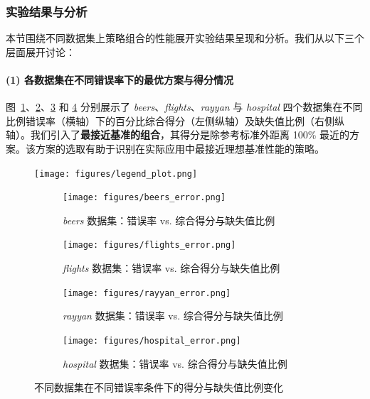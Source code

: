 \documentclass[10pt]{article} %
\numberwithin{equation}{section}
\begin{document}
\subsubsection{实验结果与分析}
\label{sec:exp_result_all}
本节围绕不同数据集上策略组合的性能展开实验结果呈现和分析。我们从以下三个层面展开讨论：
\paragraph{(1) 各数据集在不同错误率下的最优方案与得分情况}  
图~\ref{fig:beers_error}、\ref{fig:flights_error}、\ref{fig:rayyan_error} 和 \ref{fig:hospital_error} 分别展示了 \textit{beers}、\textit{flights}、\textit{rayyan} 与 \textit{hospital} 四个数据集在不同比例错误率（横轴）下的百分比综合得分（左侧纵轴）及缺失值比例（右侧纵轴）。我们引入了\textbf{最接近基准的组合}，其得分是除参考标准外距离 100\% 最近的方案。该方案的选取有助于识别在实际应用中最接近理想基准性能的策略。

\begin{figure}[htbp]
    \centering
    \texttt{[image: figures/legend\_plot.png]} %
    \vspace{-14pt} %
\end{figure}

\begin{figure}[htbp]
  \centering
  \begin{subfigure}{0.49\linewidth} %
    \centering
    \texttt{[image: figures/beers\_error.png]} %
    \caption{\textit{beers} 数据集：错误率 vs. 综合得分与缺失值比例}
    \label{fig:beers_error}
  \end{subfigure}
  \hfill
  \begin{subfigure}{0.49\linewidth}
    \centering
    \texttt{[image: figures/flights\_error.png]}
    \caption{\textit{flights} 数据集：错误率 vs. 综合得分与缺失值比例}
    \label{fig:flights_error}
  \end{subfigure}

  \vspace{0.5em} %

  \begin{subfigure}{0.49\linewidth}
    \centering
    \texttt{[image: figures/rayyan\_error.png]}
    \caption{\textit{rayyan} 数据集：错误率 vs. 综合得分与缺失值比例}
    \label{fig:rayyan_error}
  \end{subfigure}
  \hfill
  \begin{subfigure}{0.49\linewidth}
    \centering
    \texttt{[image: figures/hospital\_error.png]}
    \caption{\textit{hospital} 数据集：错误率 vs. 综合得分与缺失值比例}
    \label{fig:hospital_error}
  \end{subfigure}

  \caption{不同数据集在不同错误率条件下的得分与缺失值比例变化}
  \label{fig:all_datasets}
\end{figure}
\end{document}
